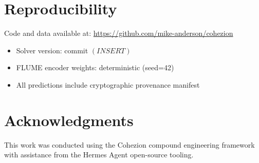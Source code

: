 \documentclass[11pt]{article}
\begin{document}
\section{Reproducibility}

Code and data available at: \url{https://github.com/mike-anderson/cohezion}

\begin{itemize}
\item Solver version: commit $(INSERT)$
\item FLUME encoder weights: deterministic (seed=42)
\item All predictions include cryptographic provenance manifest
\end{itemize}

\section*{Acknowledgments}

This work was conducted using the Cohezion compound engineering framework with assistance from the Hermes Agent open-source tooling.
\end{document}
